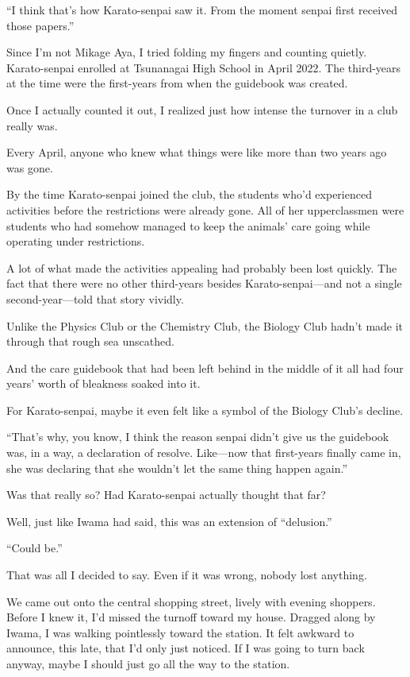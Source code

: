 \documentclass[
    a4paper,
    12pt,
    twoside,
    openany,
    UTF8,
    fontset=windows
]{ctexbook}
\begin{document}
``I think that's how Karato-senpai saw it. From the moment senpai first received those papers.''

Since I'm not Mikage Aya, I tried folding my fingers and counting quietly. Karato-senpai enrolled at Tsunanagai High School in April 2022. The third-years at the time were the first-years from when the guidebook was created.

Once I actually counted it out, I realized just how intense the turnover in a club really was.

Every April, anyone who knew what things were like more than two years ago was gone.

By the time Karato-senpai joined the club, the students who'd experienced activities before the restrictions were already gone. All of her upperclassmen were students who had somehow managed to keep the animals' care going while operating under restrictions.

A lot of what made the activities appealing had probably been lost quickly. The fact that there were no other third-years besides Karato-senpai---and not a single second-year---told that story vividly.

Unlike the Physics Club or the Chemistry Club, the Biology Club hadn't made it through that rough sea unscathed.

And the care guidebook that had been left behind in the middle of it all had four years' worth of bleakness soaked into it.

For Karato-senpai, maybe it even felt like a symbol of the Biology Club's decline.

``That's why, you know, I think the reason senpai didn't give us the guidebook was, in a way, a declaration of resolve. Like---now that first-years finally came in, she was declaring that she wouldn't let the same thing happen again.''

Was that really so? Had Karato-senpai actually thought that far?

Well, just like Iwama had said, this was an extension of ``delusion.''

``Could be.''

That was all I decided to say. Even if it was wrong, nobody lost anything.

We came out onto the central shopping street, lively with evening shoppers. Before I knew it, I'd missed the turnoff toward my house. Dragged along by Iwama, I was walking pointlessly toward the station. It felt awkward to announce, this late, that I'd only just noticed. If I was going to turn back anyway, maybe I should just go all the way to the station.
\end{document}
